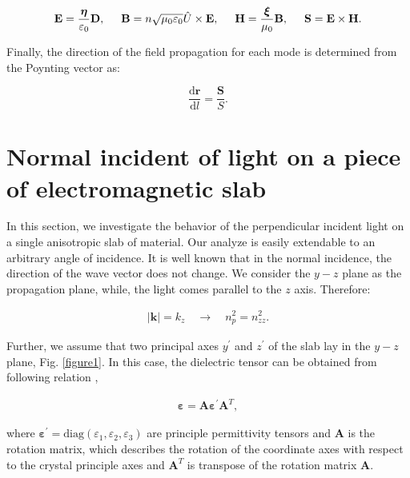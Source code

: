 \documentclass[9pt,twocolumn,twoside]{osajnl}
\begin{document}
\begin{equation}\label{e.h}
\mathbf{E}=\frac{\boldsymbol\eta}{\varepsilon_{0}}\mathbf{D}, \hspace{.5cm}  \mathbf{B}=n\sqrt{\mu_{0}\varepsilon_{0}}  \hat{U}\times{\mathbf{E}}, \hspace{.5cm}\mathbf{H}=\frac{\boldsymbol\xi}{\mu_{0}}\mathbf{B},
\hspace{.5cm}\mathbf{S}=  \mathbf{E}\times \mathbf{H}.
\end{equation}

Finally, the direction of the field propagation for each mode is determined from the Poynting vector as: 

\begin{equation}\label{p.v}
\dfrac{\mathbf{\mathrm{d}{r}}}{\mathrm{d}{l}}=\dfrac{\mathbf{S}}{S}.
\end{equation}


\section{Normal incident of light on a piece of electromagnetic slab} \label{general-normal}

In this section, we investigate the behavior of the perpendicular incident light on a single anisotropic slab of material.
Our analyze is easily extendable to an arbitrary angle of incidence.
It is well known that in the normal incidence, the direction of the wave vector does not change.  We consider the $y-z$ plane as the propagation plane, while, the light comes parallel to the $z$ axis. Therefore:  

\begin{eqnarray}\label{pt}
|\mathbf{k}|=k_{z} \quad\rightarrow \quad {n}^{2}_{p}=n^{2}_{zz}.
\end{eqnarray} 

Further, we assume that two principal axes  $y^{\prime}$ and $z^{\prime}$ of the slab lay in the $y-z$ plane, Fig. \ref{figure1}.
In this case, the dielectric tensor can be obtained from following relation \cite{yeh1980optics},

 \begin{eqnarray}\label{t.t}
        \boldsymbol{\varepsilon}= \mathbf{A} \boldsymbol{\varepsilon^{\prime}}\mathbf{A}^{T},
\end{eqnarray}

where $ \boldsymbol{\varepsilon^{\prime}} = \mbox{diag} (\varepsilon_{1},\varepsilon_{2},\varepsilon_{3})$ are  principle permittivity tensors and $\mathbf{A}$  is the rotation matrix, which describes the rotation of the coordinate axes with respect to the crystal principle axes and $ \mathbf{A}^{T}$ is transpose of the rotation matrix $ \mathbf{A}$.
\end{document}
